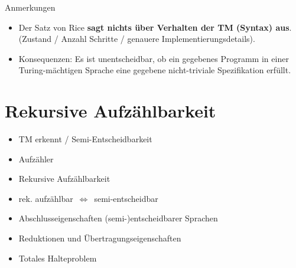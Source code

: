 \documentclass[a4paper,graphics,11pt]{article}
\newcommand{\godel}[1]{\langle #1 \rangle}
\newcommand{\Iff}[0]{\,\Longleftrightarrow\,}
\begin{document}
Anmerkungen
\begin{itemize}
    \item Der Satz von Rice \textbf{sagt nichts über Verhalten der TM (Syntax) aus}.\\
        (Zustand / Anzahl Schritte / genauere Implementierungsdetails).
    \item Konsequenzen: Es ist unentscheidbar, ob ein gegebenes Programm in einer
        Turing-mächtigen Sprache eine gegebene nicht-triviale Spezifikation erfüllt.
\end{itemize}



\newpage



\section{Rekursive Aufzählbarkeit}

\begin{itemize}
    \item TM erkennt / Semi-Entscheidbarkeit
    \item Aufzähler
    \item Rekursive Aufzählbarkeit
    \item rek. aufzählbar $\Iff$ semi-entscheidbar
    \item Abschlusseigenschaften (semi-)entscheidbarer Sprachen
    \item Reduktionen und Übertragungseigenschaften
    \item Totales Halteproblem
\end{itemize}
\end{document}
